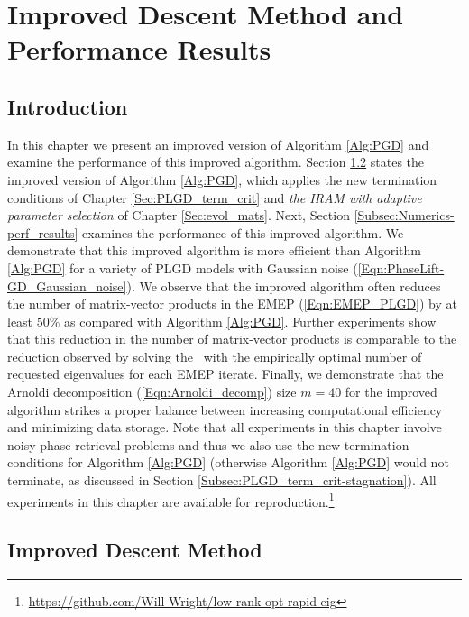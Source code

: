 \chapter{Improved Descent Method and Performance Results}
\label{Sec:Numerics}


\section{Introduction} 		\label{Subsec:Numerics-intro}

In this chapter we present an improved version of Algorithm \ref{Alg:PGD} and examine the performance of this improved algorithm.
Section \ref{Subsec:Numerics-improved_PGD} states the improved version of Algorithm \ref{Alg:PGD}, which applies the new termination conditions of Chapter \ref{Sec:PLGD_term_crit} and \textit{the IRAM with adaptive parameter selection} of Chapter \ref{Sec:evol_mats}.
Next, Section \ref{Subsec:Numerics-perf_results} examines the performance of this improved algorithm.
We demonstrate that this improved algorithm is more efficient than Algorithm \ref{Alg:PGD} for a variety of PLGD models with Gaussian noise (\ref{Eqn:PhaseLift-GD_Gaussian_noise}).
We observe that the improved algorithm often reduces the number of matrix-vector products in the EMEP (\ref{Eqn:EMEP_PLGD}) by at least $50\%$ as compared with Algorithm \ref{Alg:PGD}.
Further experiments show that this reduction in the number of matrix-vector products is comparable 
to the reduction observed by solving the \emep \ with the empirically optimal number of requested eigenvalues for each EMEP iterate.
Finally, we demonstrate that the Arnoldi decomposition (\ref{Eqn:Arnoldi_decomp}) size $m = 40$ for the improved algorithm strikes a proper balance between increasing computational efficiency and minimizing data storage.
Note that all experiments in this chapter involve noisy phase retrieval problems and thus we also use the new termination conditions for Algorithm \ref{Alg:PGD} (otherwise Algorithm \ref{Alg:PGD} would not terminate, as discussed in Section \ref{Subsec:PLGD_term_crit-stagnation}).
All experiments in this chapter are available for reproduction.\footnote{\url{https://github.com/Will-Wright/low-rank-opt-rapid-eig}}






\section{Improved Descent Method}	\label{Subsec:Numerics-improved_PGD}


